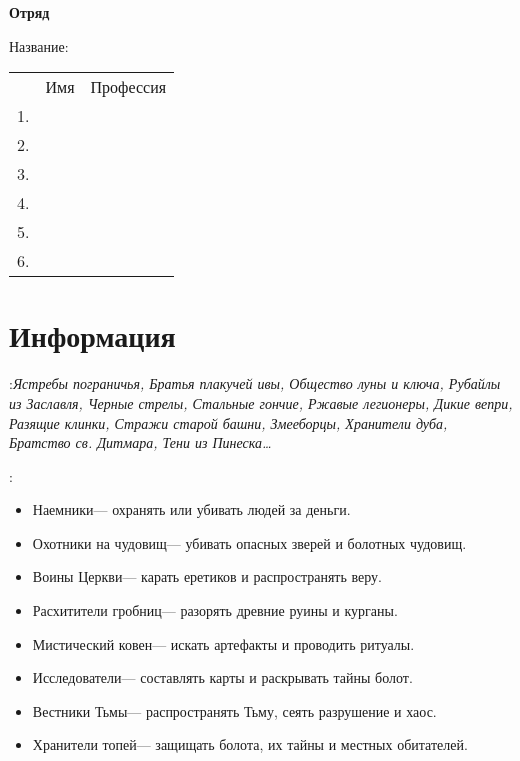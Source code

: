 \documentclass[10pt,twoside]{report}
\begin{document}
\thispagestyle{empty}
\begin{center}
{\LARGE \textbf{Отряд}}

\end{center}
{\LARGE

  Название:\hfill

  \vfill
  
\begin{tabular}{p{1cm} p{2cm} c}
   & Имя & Профессия \\
  1. & & \\
  2. & & \\
  3. & & \\
  4. & & \\
  5. & & \\
  6. & & \\
\end{tabular}
}
\vfill
\pagebreak

\section*{Информация}
\begin{description}[noitemsep]
\item[Название отряда]:{\slshape Ястребы пограничья, Братья плакучей
    ивы, Общество луны и ключа, Рубайлы из Заславля, Черные стрелы,
    Стальные гончие, Ржавые легионеры, Дикие вепри, Разящие клинки,
    Стражи старой башни, Змееборцы, Хранители дуба, Братство
    св. Дитмара, Тени из Пинеска\ldots}
  \\ [2ex]
\item[Тип отряда и его цели]:
  \begin{itemize}[noitemsep]
    \item Наемники--- охранять или убивать людей за
      деньги.
    \item Охотники на чудовищ--- убивать опасных зверей и болотных
      чудовищ.
    \item Воины Церкви--- карать еретиков и распространять веру.
    \item Расхитители гробниц--- разорять древние руины и курганы.
    \item Мистический ковен--- искать артефакты и проводить ритуалы.
    \item Исследователи--- составлять карты и раскрывать тайны болот.
    \item Вестники Тьмы--- распространять Тьму, сеять разрушение и хаос.
    \item Хранители топей--- защищать болота, их тайны и местных обитателей.
  \end{itemize}
\end{description}
\vfill
\pagebreak
\end{document}
